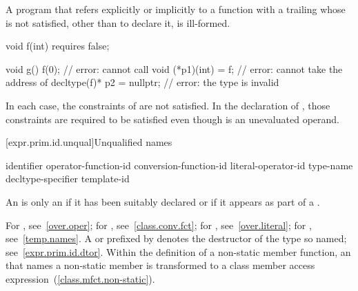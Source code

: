 \pnum
A program that refers
explicitly or implicitly
to a function with a trailing 
whose  is not satisfied,
other than to declare it,
is ill-formed.
\begin{example}
\begin{codeblock}
void f(int) requires false;

void g() {
  f(0);                         // error: cannot call 
  void (*p1)(int) = f;          // error: cannot take the address of 
  decltype(f)* p2 = nullptr;    // error: the type  is invalid
}
\end{codeblock}
In each case, the constraints of  are not satisfied.
In the declaration of ,
those constraints are required to be satisfied
even though
 is an unevaluated operand.
\end{example}

[expr.prim.id.unqual]{Unqualified names}

\begin{bnf}
\br
    identifier\br
    operator-function-id\br
    conversion-function-id\br
    literal-operator-id\br
    \terminal{\~} type-name\br
    \terminal{\~} decltype-specifier\br
    template-id
\end{bnf}

\pnum
{}%
An  is only
an  if it has
been suitably declared
or if it appears as part of a .
\begin{note}
For , see~\ref{over.oper}; for
, see~\ref{class.conv.fct}; for
, see~\ref{over.literal}; for
, see~\ref{temp.names}.
A  or 
prefixed by \tcode{\~} denotes the destructor of the type so named;
see~\ref{expr.prim.id.dtor}.
Within the definition of a non-static member function, an
 that names a non-static member is transformed to a
class member access expression~(\ref{class.mfct.non-static}).
\end{note}

